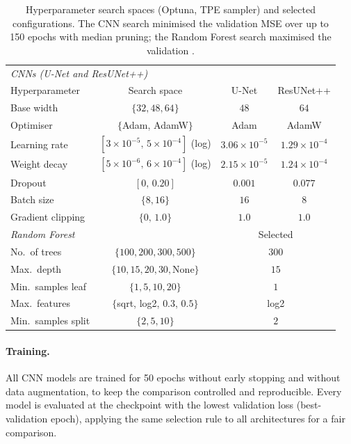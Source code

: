 \begin{table}[t]
  \centering
  \caption{Hyperparameter search spaces (Optuna, TPE sampler) and selected
  configurations. The CNN search minimised the validation MSE over up to 150
  epochs with median pruning; the Random Forest search maximised the validation
  \Rsq{}.}
  \label{tab:hyperparams}
  \small
  \begin{tabular}{lccc}
    \toprule
    \multicolumn{4}{l}{\textit{CNNs (U-Net and ResUNet++)}}\\
    Hyperparameter & Search space & U-Net & ResUNet++ \\
    \midrule
    Base width        & $\{32, 48, 64\}$                      & $48$ & $64$ \\
    Optimiser         & $\{$Adam, AdamW$\}$                   & Adam & AdamW \\
    Learning rate     & $[3{\times}10^{-5},\,5{\times}10^{-4}]$ (log) & $3.06{\times}10^{-5}$ & $1.29{\times}10^{-4}$ \\
    Weight decay      & $[5{\times}10^{-6},\,6{\times}10^{-4}]$ (log) & $2.15{\times}10^{-5}$ & $1.24{\times}10^{-4}$ \\
    Dropout           & $[0,\,0.20]$                          & $0.001$ & $0.077$ \\
    Batch size        & $\{8, 16\}$                           & $16$ & $8$ \\
    Gradient clipping & $\{0,\,1.0\}$                         & $1.0$ & $1.0$ \\
    \midrule
    \multicolumn{2}{l}{\textit{Random Forest}} & \multicolumn{2}{c}{Selected} \\
    \midrule
    No.\ of trees      & $\{100, 200, 300, 500\}$            & \multicolumn{2}{c}{$300$} \\
    Max.\ depth        & $\{10, 15, 20, 30, \text{None}\}$   & \multicolumn{2}{c}{$15$} \\
    Min.\ samples leaf & $\{1, 5, 10, 20\}$                  & \multicolumn{2}{c}{$1$} \\
    Max.\ features     & $\{$sqrt, log2, $0.3$, $0.5\}$      & \multicolumn{2}{c}{log2} \\
    Min.\ samples split& $\{2, 5, 10\}$                      & \multicolumn{2}{c}{$2$} \\
    \bottomrule
  \end{tabular}
\end{table}

\paragraph{Training.}
All CNN models are trained for 50 epochs without early stopping and without
data augmentation, to keep the comparison controlled and reproducible. Every
model is evaluated at the checkpoint with the lowest validation loss
(best-validation epoch), applying the same selection rule to all architectures
for a fair comparison.

